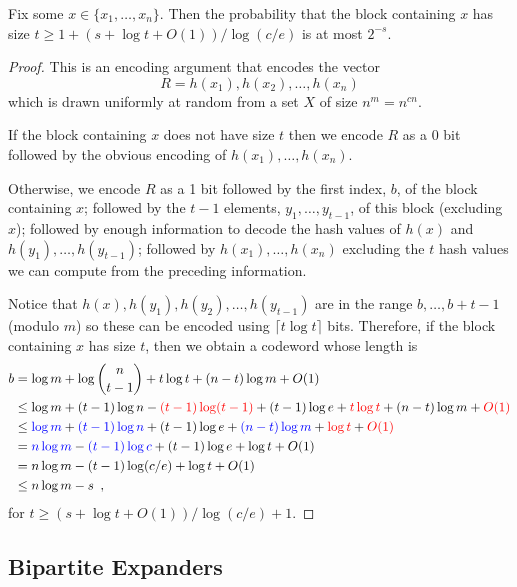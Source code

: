 \documentclass[lotsofwhite]{patmorin}
\begin{document}
\begin{thm}
  Fix some $x\in\{x_1,\ldots,x_n\}$. Then the probability that the block
  containing $x$ has size $t\ge 1+(s+\log t + O(1))/\log(c/e)$ is at most $2^{-s}$.
\end{thm}

\begin{proof}
  This is an encoding argument that encodes the vector 
  \[
     R = h(x_1),h(x_2),\ldots,h(x_n)
  \]
  which is drawn uniformly at random from a set $X$ of size $n^{m}=n^{cn}$.
  
  If the block containing $x$ does not have size $t$ then we encode $R$
  as a 0 bit followed by the obvious encoding of $h(x_1),\ldots,h(x_n)$.
  
  Otherwise, we encode $R$ as a 1 bit followed by the first index,
  $b$, of the block containing $x$; followed by the $t-1$ elements,
  $y_1,\ldots,y_{t-1}$, of this block (excluding $x$); followed
  by enough information to decode the hash values of $h(x)$ and
  $h(y_1),\ldots,h(y_{t-1})$; followed by $h(x_1),\ldots,h(x_n)$ excluding
  the $t$ hash values we can compute from the preceding information.

  Notice that $h(x),h(y_1),h(y_2),\ldots,h(y_{t-1})$ are in the range
  $b,\ldots,b+t-1$ (modulo $m$) so these can be encoded using $\lceil
  t\log t\rceil$ bits.  Therefore, if the block containing $x$ has size $t$,
  then we obtain a codeword whose length is
  \begin{align*}
    b & = \log m + \log\binom{n}{t-1} + t\log t + (n-t)\log m + O(1) \\
       & \le \log m + (t-1)\log n - 
           {\color{red}(t-1)\log(t-1)} + (t-1)\log e + {\color{red}t\log t} + (n-t)\log m + {\color{red}O(1)}\\
       & \le {\color{blue}\log m} + {\color{blue}(t-1)\log n} + (t-1)\log e + {\color{blue}(n-t)\log m} + {\color{red}\log t}+ {\color{red} O(1)}\\
       & = {\color{blue}n\log m} - {\color{blue}(t-1)\log c} + (t-1)\log e + \log t + O(1) \\
       & = n\log m - (t-1)\log(c/e) + \log t + O(1) \\
       & \le n\log m - s \enspace ,
  \end{align*}
  for $t\ge (s+\log t+O(1))/\log (c/e) + 1$.
\end{proof}



\subsection{Bipartite Expanders}
\end{document}
